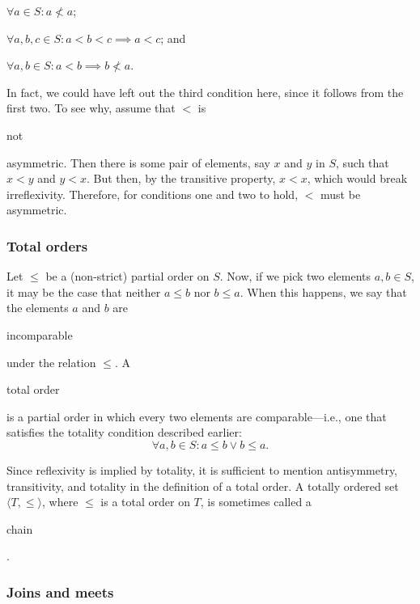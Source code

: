 \documentclass[11pt]{article}
\theoremstyle{plain}
\theoremstyle{definition}
\newenvironment{packed_enum}{
\begin{enumerate}
  \setlength{\itemsep}{1pt}
  \setlength{\parskip}{0pt}
  \setlength{\parsep}{0pt}
}{\end{enumerate}}
\begin{document}
\begin{packed_enum}
  \item $ \forall a \in S : a \not < a $;
  \item $ \forall a, b, c \in S : a < b < c \implies a < c $; and
  \item $ \forall a, b \in S : a < b \implies b \not < a $.
\end{packed_enum}

\noindent In fact, we could have left out the third condition here, since it follows from the first two.
To see why, assume that $ < $ is \begin{em}not\end{em} asymmetric. Then there is some pair of elements, say $ x $ and $ y $ in $ S $, such that $ x < y $ and $ y < x $. But then, by the transitive property, $ x < x $, which would break irreflexivity. Therefore, for conditions one and two to hold, $ < $ must be asymmetric.

\subsubsection*{Total orders}

Let $ \le $ be a (non-strict) partial order on $ S $. Now, if we pick two elements $ a, b \in S $, it may be the case that neither $ a \le b $ nor $ b \le a $. When this happens, we say that the elements $ a $ and $ b $ are \begin{em}incomparable\end{em} under the relation $ \le $. 
A \begin{em}total order\end{em} is a partial order in which every two elements are comparable---i.e., one that satisfies the totality condition described earlier: 
$$ 
  \forall a, b \in S : a \le b \vee b \le a.
$$

\noindent Since reflexivity is implied by totality, it is sufficient to mention antisymmetry, transitivity, and totality in the definition of a total order. A totally ordered set $ \langle T, \le \rangle $, where $ \le $ is a total order on $ T $, is sometimes called a \begin{em}chain\end{em}. 

\subsubsection*{Joins and meets}
\end{document}
